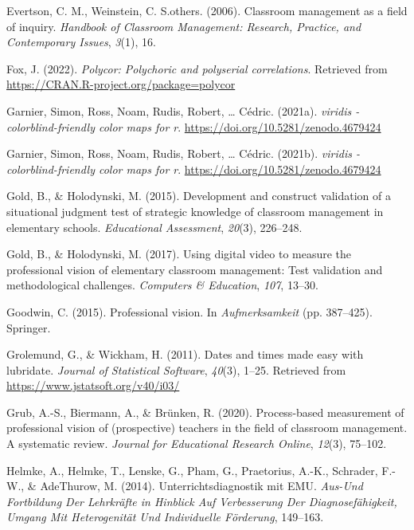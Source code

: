 \documentclass[
  man,floatsintext]{apa6}
\newlength{\cslhangindent}
\newlength{\cslentryspacingunit} %
\newenvironment{CSLReferences}[2] %
 {%
  \setlength{\parindent}{0pt}
  \ifodd #1
  \let\oldpar\par
  \def\par{\hangindent=\cslhangindent\oldpar}
  \fi
  \setlength{\parskip}{#2\cslentryspacingunit}
 }%
 {}
\begin{document}
\begin{CSLReferences}{1}{0}
\leavevmode{}%
Evertson, C. M., Weinstein, C. S.others. (2006). Classroom management as a field of inquiry. \emph{Handbook of Classroom Management: Research, Practice, and Contemporary Issues}, \emph{3}(1), 16.

\leavevmode{}%
Fox, J. (2022). \emph{Polycor: Polychoric and polyserial correlations}. Retrieved from \url{https://CRAN.R-project.org/package=polycor}

\leavevmode{}%
Garnier, Simon, Ross, Noam, Rudis, Robert, \ldots{} Cédric. (2021a). \emph{{viridis} - colorblind-friendly color maps for r}. \url{https://doi.org/10.5281/zenodo.4679424}

\leavevmode{}%
Garnier, Simon, Ross, Noam, Rudis, Robert, \ldots{} Cédric. (2021b). \emph{{viridis} - colorblind-friendly color maps for r}. \url{https://doi.org/10.5281/zenodo.4679424}

\leavevmode{}%
Gold, B., \& Holodynski, M. (2015). Development and construct validation of a situational judgment test of strategic knowledge of classroom management in elementary schools. \emph{Educational Assessment}, \emph{20}(3), 226--248.

\leavevmode{}%
Gold, B., \& Holodynski, M. (2017). Using digital video to measure the professional vision of elementary classroom management: Test validation and methodological challenges. \emph{Computers \& Education}, \emph{107}, 13--30.

\leavevmode{}%
Goodwin, C. (2015). Professional vision. In \emph{Aufmerksamkeit} (pp. 387--425). Springer.

\leavevmode{}%
Grolemund, G., \& Wickham, H. (2011). Dates and times made easy with {lubridate}. \emph{Journal of Statistical Software}, \emph{40}(3), 1--25. Retrieved from \url{https://www.jstatsoft.org/v40/i03/}

\leavevmode{}%
Grub, A.-S., Biermann, A., \& Brünken, R. (2020). Process-based measurement of professional vision of (prospective) teachers in the field of classroom management. A systematic review. \emph{Journal for Educational Research Online}, \emph{12}(3), 75--102.

\leavevmode{}%
Helmke, A., Helmke, T., Lenske, G., Pham, G., Praetorius, A.-K., Schrader, F.-W., \& AdeThurow, M. (2014). Unterrichtsdiagnostik mit EMU. \emph{Aus-Und Fortbildung Der Lehrkr{ä}fte in Hinblick Auf Verbesserung Der Diagnosef{ä}higkeit, Umgang Mit Heterogenit{ä}t Und Individuelle F{ö}rderung}, 149--163.


\end{CSLReferences}
\end{document}
